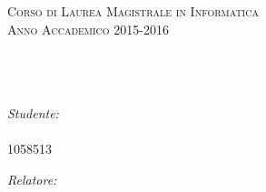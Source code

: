 \documentclass[
12pt, %
english, %
onehalfspacing, %
headsepline, %
]{MastersDoctoralThesis} %
\author{Carlo Maria \textsc{Massimo}} %
\begin{document}
\frontmatter %

\pagestyle{plain} %


\begin{titlepage}
\begin{center}

\textsc{\LARGE \univname}\\[1.5cm] %
\textsc{\large \deptname}\\[0.5cm] %

 
\textsc{ Corso di Laurea Magistrale in Informatica}\\[0.5cm] %
\textsc{\small Anno Accademico 2015-2016}\\[2.5cm] %

\HRule \\[0.4cm] %
{\huge \bfseries \ttitle}\\[0.4cm] %
\HRule \\[1.5cm] %
 
\begin{minipage}{0.4\textwidth}
\begin{flushleft} \large
\emph{Studente:}\\
\authorname\\1058513 %
\end{flushleft}
\end{minipage}
\begin{minipage}{0.4\textwidth}
\begin{flushright} \large
\emph{Relatore:} \\
\supname %
\end{flushright}
\end{minipage}\\[3cm]
 
 
\vfill
\end{center}
\end{titlepage}
\end{document}
